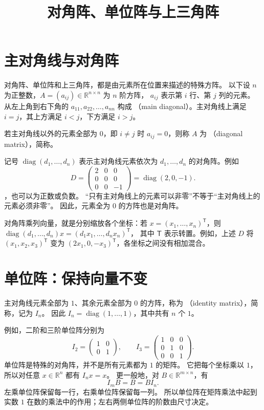 \documentclass[UTF8,12pt,a4paper,fontset=fandol]{ctexart}
\title{对角阵、单位阵与上三角阵}
\author{}
\date{}
\begin{document}
\maketitle

\section{主对角线与对角阵}

对角阵、单位阵和上三角阵，都是由元素所在位置来描述的特殊方阵。
以下设 $n$ 为正整数，$A=(a_{ij})\in\mathbb R^{n\times n}$ 为 $n$ 阶方阵，
$a_{ij}$ 表示第 $i$ 行、第 $j$ 列的元素。
从左上角到右下角的 $a_{11},a_{22},\ldots,a_{nn}$ 构成
（main diagonal）。主对角线上满足 $i=j$，其上方满足 $i<j$，下方满足 $i>j$。

\begin{definition}[对角阵]
若主对角线以外的元素全部为 $0$，即 $i\ne j$ 时 $a_{ij}=0$，则称 $A$ 为
（diagonal matrix），简称。
\end{definition}

记号 $\operatorname{diag}(d_1,\ldots,d_n)$ 表示主对角线元素依次为 $d_1,\ldots,d_n$ 的对角阵。例如
\[
  D=\begin{pmatrix}2&0&0\\0&0&0\\0&0&-1\end{pmatrix}
   =\operatorname{diag}(2,0,-1).
\]
，也可以为正数或负数。
“只有主对角线上的元素可以非零”不等于“主对角线上的元素必须非零”。
因此，元素全为 $0$ 的方阵也是对角阵。

对角阵乘列向量，就是分别缩放各个坐标：若 $x=(x_1,\ldots,x_n)^{\mathsf T}$，则
$\operatorname{diag}(d_1,\ldots,d_n)x=(d_1x_1,\ldots,d_nx_n)^{\mathsf T}$，
其中 $\mathsf T$ 表示转置。例如，上述 $D$ 将 $(x_1,x_2,x_3)^{\mathsf T}$ 变为
$(2x_1,0,-x_3)^{\mathsf T}$，各坐标之间没有相加混合。

\section{单位阵：保持向量不变}

\begin{definition}[单位阵]
主对角线元素全部为 $1$、其余元素全部为 $0$ 的方阵，称为
（identity matrix），简称，记为 $I_n$。
因此 $I_n=\operatorname{diag}(1,\ldots,1)$，其中共有 $n$ 个 $1$。
\end{definition}

例如，二阶和三阶单位阵分别为
\[
  I_2=\begin{pmatrix}1&0\\0&1\end{pmatrix},\qquad
  I_3=\begin{pmatrix}1&0&0\\0&1&0\\0&0&1\end{pmatrix}.
\]
单位阵是特殊的对角阵，并不是所有元素都为 $1$ 的矩阵。
它把每个坐标乘以 $1$，所以对任意 $x\in\mathbb R^n$ 都有 $I_nx=x$。
更一般地，对 $B\in\mathbb R^{m\times n}$，有
\[
  I_mB=B=BI_n.
\]
左乘单位阵保留每一行，右乘单位阵保留每一列。
所以单位阵在矩阵乘法中起到实数 $1$ 在数的乘法中的作用；左右两侧单位阵的阶数由尺寸决定。
\end{document}
